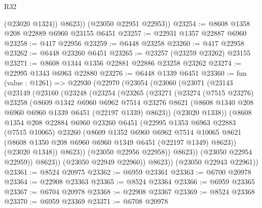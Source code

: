\begin{lexlean}{R32}
\begin{coremodule}
            (@23020 @1324))
          @8623))
      (@23050 @22951 @22953))
@23254 := @8608 @1358 @208 @22889 @6960 @23155 @6451
@23257 := @22931 @1357 @22887 @6960
@23258 := @417 @22956
@23259 := @6448 @23258
@23260 := @417 @22958
@23262 := @6448 @23260 @6451
@23265 := @23257 (@23259 @23262) @23155
@23271 := @8608 @1344 @1356 @22881 @22886 @23258 @23262
@23274 := @22995 @1343 @6963 @22880
@23276 := @6448 @1339 @6451
@23360 := fun (value : @1261) =>
  @22930
    (@22970
      (@23054
        (@23060
          (@23071
            (@23143
              (@23149
                (@23160
                  (@23248
                    (@23254
                      (@23265
                        (@23271
                          (@23274
                            (@7515 @23276)
                            @23258
                            (@8609
                              @1342
                              @6960
                              @6962
                              @7514
                              @23276
                              @8621
                              (@8608 @1340 @208 @6960 @6960 @1339 @6451 (@22197 @1339) @8623))
                            (@23020 @1338))
                          (@8608
                            @1354
                            @208
                            @22884
                            @6960
                            @23260
                            @6451
                            (@22995
                              @1353
                              @6963
                              @22883
                              (@7515 @10065)
                              @23260
                              (@8609
                                @1352
                                @6960
                                @6962
                                @7514
                                @10065
                                @8621
                                (@8608 @1350 @208 @6960 @6960 @1349 @6451 (@22197 @1349) @8623))
                              (@23020 @1348))
                            @8623))
                        (@23050 @22956 @22958))
                      @8623))
                  (@23050 @22954 @22959))
                @8623))
            (@23050 @22949 @22960))
          @8623))
      (@23050 @22943 @22961))
@23361 := @8524 @20975
@23362 := @6959 @23361
@23363 := @6700 @20978
@23364 := @22908 @23363
@23365 := @8524 @23364
@23366 := @6959 @23365
@23367 := @6704 @20978
@23368 := @22908 @23367
@23369 := @8524 @23368
@23370 := @6959 @23369
@23371 := @6708 @20978

\end{coremodule}
\end{lexlean}
